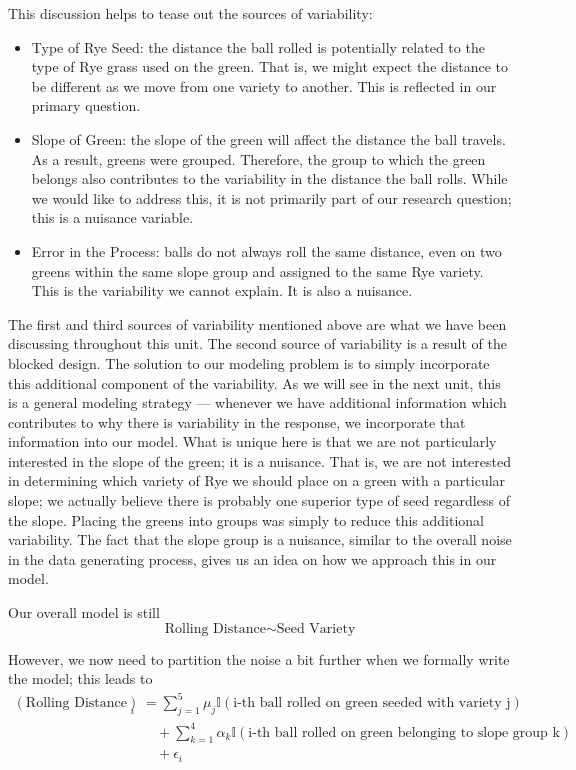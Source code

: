 \documentclass[]{book}
\providecommand{\tightlist}{%
  \setlength{\itemsep}{0pt}\setlength{\parskip}{0pt}}
\theoremstyle{definition}
\theoremstyle{definition}
\theoremstyle{definition}
\theoremstyle{remark}
\begin{document}
This discussion helps to tease out the sources of variability:

\begin{itemize}
\tightlist
\item
  Type of Rye Seed: the distance the ball rolled is potentially related
  to the type of Rye grass used on the green. That is, we might expect
  the distance to be different as we move from one variety to another.
  This is reflected in our primary question.
\item
  Slope of Green: the slope of the green will affect the distance the
  ball travels. As a result, greens were grouped. Therefore, the group
  to which the green belongs also contributes to the variability in the
  distance the ball rolls. While we would like to address this, it is
  not primarily part of our research question; this is a nuisance
  variable.
\item
  Error in the Process: balls do not always roll the same distance, even
  on two greens within the same slope group and assigned to the same Rye
  variety. This is the variability we cannot explain. It is also a
  nuisance.
\end{itemize}

The first and third sources of variability mentioned above are what we
have been discussing throughout this unit. The second source of
variability is a result of the blocked design. The solution to our
modeling problem is to simply incorporate this additional component of
the variability. As we will see in the next unit, this is a general
modeling strategy --- whenever we have additional information which
contributes to why there is variability in the response, we incorporate
that information into our model. What is unique here is that we are not
particularly interested in the slope of the green; it is a nuisance.
That is, we are not interested in determining which variety of Rye we
should place on a green with a particular slope; we actually believe
there is probably one superior type of seed regardless of the slope.
Placing the greens into groups was simply to reduce this additional
variability. The fact that the slope group is a nuisance, similar to the
overall noise in the data generating process, gives us an idea on how we
approach this in our model.

Our overall model is still
\[\text{Rolling Distance} \sim \text{Seed Variety}\]

However, we now need to partition the noise a bit further when we
formally write the model; this leads to \[
\begin{aligned}
  (\text{Rolling Distance})_i &= \sum_{j=1}^{5} \mu_j \mathbb{I}(\text{i-th ball rolled on green seeded with variety j}) \\
    &\quad + \sum_{k=1}^{4} \alpha_k\mathbb{I}(\text{i-th ball rolled on green belonging to slope group k}) \\
    &\quad + \epsilon_i
\end{aligned}
\]
\end{document}
